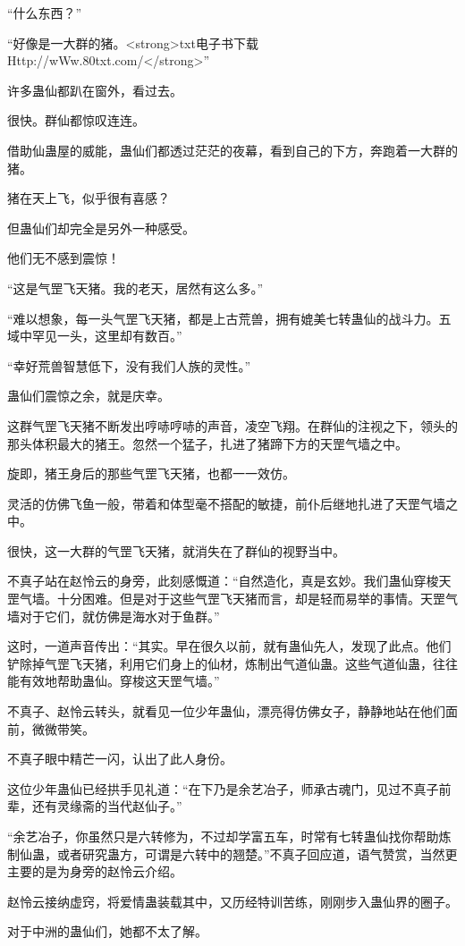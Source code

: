 \begin{this_body}
“什么东西？”

“好像是一大群的猪。<strong>txt电子书下载Http://wWw.80txt.com/</strong>”

许多蛊仙都趴在窗外，看过去。

很快。群仙都惊叹连连。

借助仙蛊屋的威能，蛊仙们都透过茫茫的夜幕，看到自己的下方，奔跑着一大群的猪。

猪在天上飞，似乎很有喜感？

但蛊仙们却完全是另外一种感受。

他们无不感到震惊！

“这是气罡飞天猪。我的老天，居然有这么多。”

“难以想象，每一头气罡飞天猪，都是上古荒兽，拥有媲美七转蛊仙的战斗力。五域中罕见一头，这里却有数百。”

“幸好荒兽智慧低下，没有我们人族的灵性。”

蛊仙们震惊之余，就是庆幸。

这群气罡飞天猪不断发出哼哧哼哧的声音，凌空飞翔。在群仙的注视之下，领头的那头体积最大的猪王。忽然一个猛子，扎进了猪蹄下方的天罡气墙之中。

旋即，猪王身后的那些气罡飞天猪，也都一一效仿。

灵活的仿佛飞鱼一般，带着和体型毫不搭配的敏捷，前仆后继地扎进了天罡气墙之中。

很快，这一大群的气罡飞天猪，就消失在了群仙的视野当中。

不真子站在赵怜云的身旁，此刻感慨道：“自然造化，真是玄妙。我们蛊仙穿梭天罡气墙。十分困难。但是对于这些气罡飞天猪而言，却是轻而易举的事情。天罡气墙对于它们，就仿佛是海水对于鱼群。”

这时，一道声音传出：“其实。早在很久以前，就有蛊仙先人，发现了此点。他们铲除掉气罡飞天猪，利用它们身上的仙材，炼制出气道仙蛊。这些气道仙蛊，往往能有效地帮助蛊仙。穿梭这天罡气墙。”

不真子、赵怜云转头，就看见一位少年蛊仙，漂亮得仿佛女子，静静地站在他们面前，微微带笑。

不真子眼中精芒一闪，认出了此人身份。

这位少年蛊仙已经拱手见礼道：“在下乃是余艺冶子，师承古魂门，见过不真子前辈，还有灵缘斋的当代赵仙子。”

“余艺冶子，你虽然只是六转修为，不过却学富五车，时常有七转蛊仙找你帮助炼制仙蛊，或者研究蛊方，可谓是六转中的翘楚。”不真子回应道，语气赞赏，当然更主要的是为身旁的赵怜云介绍。

赵怜云接纳虚窍，将爱情蛊装载其中，又历经特训苦练，刚刚步入蛊仙界的圈子。

对于中洲的蛊仙们，她都不太了解。


\end{this_body}

